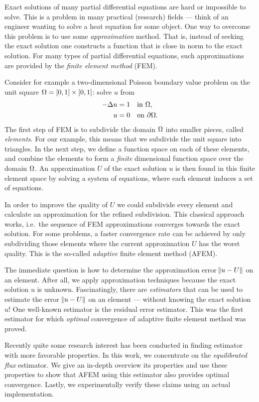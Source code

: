 \documentclass[thesis.tex]{subfiles}
\begin{document}
Exact solutions of many partial differential equations are hard or impossible to solve. 
This is a problem in many practical (research) fields --- think of an engineer wanting to solve a heat
equation for some object. One way to overcome this problem is to use some \emph{approximation} method.
That is, instead of seeking the exact solution one constructs a function that is close in norm to the exact solution.
For many types of partial differential equations, such approximations are provided by the \emph{finite element method} (FEM).

Consider for example a two-dimensional Poisson
boundary value problem on the unit square $\Omega = [0,1] \times [0,1]$: solve $u$ from
  \begin{equation*}
  \begin{alignedat}{2}
    -\Delta u &=1& \quad &\text {in } \Omega, \\
    u &= 0 &\quad &\text{on } \partial\Omega.
  \end{alignedat}
\end{equation*}
The first step of FEM is to subdivide the domain $\Omega$ into smaller pieces, called \emph{elements}. 
For our example, this means that
we subdivide the unit square into triangles. In the next step, we define a function space on each of these elements, and
combine the elements to form a \emph{finite} dimensional function space over the domain $\Omega$. An approximation $U$ of the exact solution $u$
is then found in this finite element space by solving a system of equations, where each element induces a set of equations.

In order to improve the quality of $U$ we could subdivide every element and calculate an approximation for the
refined subdivision. This classical approach works, i.e.~the sequence of FEM approximations converges towards the exact solution.
For some problems, a faster convergence rate can be achieved by only subdividing
those elements where the current approximation $U$ has the worst quality. This is the so-called \emph{adaptive} finite element method (AFEM).

The immediate question is how to determine the approximation error $\norm{u - U}$ on an element. After all, we apply approximation techniques
because the exact solution $u$ is unknown. Fascinatingly, there are \emph{estimators} that can be used
to estimate the error $\norm{u - U}$ on an element --- without knowing the exact solution $u$! One well-known
estimator is the residual error estimator. This was the first estimator for which \emph{optimal} convergence of adaptive finite element 
method was proved.

Recently quite some research interest has been conducted in finding estimator with more favorable properties.
In this work, we concentrate on the \emph{equilibrated flux} estimator. We give an in-depth overview its
properties and use these properties to show that AFEM using this estimator also provides optimal convergence.
Lastly, we experimentally verify these claims using an actual implementation.
\end{document}
